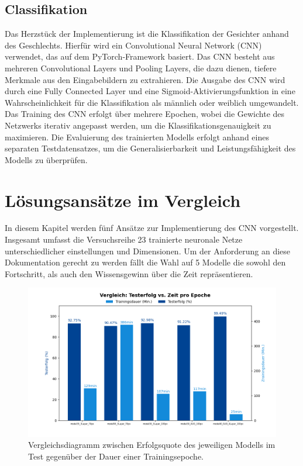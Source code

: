 \documentclass[journal,twoside,web]{ieeecolor}
\begin{document}
\subsection{Classifikation}
Das Herzstück der Implementierung ist die Klassifikation der Gesichter anhand des Geschlechts. Hierfür wird ein Convolutional Neural Network (CNN) verwendet, das auf dem PyTorch-Framework basiert. Das CNN besteht aus mehreren Convolutional Layers und Pooling Layers, die dazu dienen, tiefere Merkmale aus den Eingabebildern zu extrahieren. Die Ausgabe des CNN wird durch eine Fully Connected Layer und eine Sigmoid-Aktivierungsfunktion in eine Wahrscheinlichkeit für die Klassifikation als männlich oder weiblich umgewandelt. Das Training des CNN erfolgt über mehrere Epochen, wobei die Gewichte des Netzwerks iterativ angepasst werden, um die Klassifikationsgenauigkeit zu maximieren. Die Evaluierung des trainierten Modells erfolgt anhand eines separaten Testdatensatzes, um die Generalisierbarkeit und Leistungsfähigkeit des Modells zu überprüfen.



\section{Lösungsansätze im Vergleich}
In diesem Kapitel werden fünf Ansätze zur Implementierung des CNN vorgestellt. Insgesamt umfasst die Versuchsreihe 23 trainierte neuronale Netze unterschiedlicher einstellungen und Dimensionen.
Um der Anforderung an diese Dokumentation gerecht zu werden fällt die Wahl auf 5 Modelle die sowohl den Fortschritt, als auch den Wissensgewinn über die Zeit repräsentieren.

\begin{figure}[H]
    \centerline{\includegraphics[width=\columnwidth]{Erfolg_Dauer.png}}
    \caption{Vergleichsdiagramm zwischen Erfolgsquote des jeweiligen Modells im Test gegenüber der Dauer einer Trainingsepoche.}
    \label{fig:compareGraph}
\end{figure}
\end{document}
